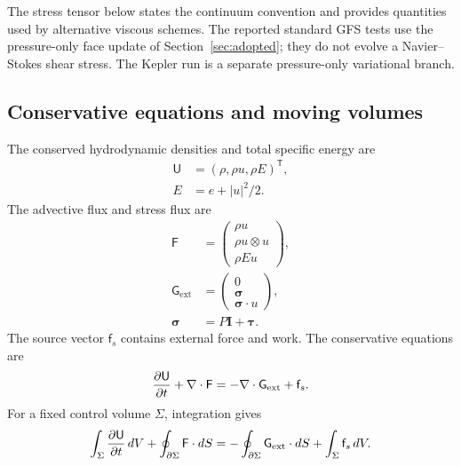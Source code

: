 \documentclass[twocolumn]{aastex63}
\newcommand{\vel}{{u}}
\newcommand{\surf}[0]{S}
\begin{document}
The stress tensor below states the continuum convention and provides
quantities used by alternative viscous schemes. The reported standard GFS
tests use the pressure-only face update of Section~\ref{sec:adopted}; they do
not evolve a Navier--Stokes shear stress. The Kepler run is a separate
pressure-only variational branch.

\subsection{Conservative equations and moving volumes}
The conserved hydrodynamic densities and total specific energy are
\begin{equation*}
\begin{aligned}
  \mathsf{U}&=(\rho,\rho\vel,\rho E)^\mathsf{T},\\
  E&=e+|\vel|^2/2.
\end{aligned}
\end{equation*}
The advective flux and stress flux are
\begin{equation}
\begin{aligned}
\mathsf{F}&=\begin{pmatrix}
  \rho\vel \\
  \rho\vel\otimes\vel \\
  \rho E\vel
\end{pmatrix},\\
\mathsf{G}_\textrm{ext}&=\begin{pmatrix}
  0 \\
  \boldsymbol{\sigma} \\
  \boldsymbol{\sigma}\cdot\vel
\end{pmatrix},\\
\boldsymbol{\sigma}&=P\boldsymbol{I}+\boldsymbol{\tau}.
\end{aligned}
\end{equation}
The source vector $\mathsf{f}_s$ contains external force and work. The
conservative equations are
\begin{equation}\label{basic1}
  {\partial\mathsf{U}\over\partial t}
  +\nabla\cdot\mathsf{F}
  =-\nabla\cdot\mathsf{G}_\textrm{ext}+\mathsf{f}_s.
\end{equation}
For a fixed control volume $\Sigma$, integration gives
\begin{equation}\label{basic}
  \int_\Sigma {\partial\mathsf{U}\over\partial t}\,dV
  +\oint_{\partial\Sigma}\mathsf{F}\cdot d\surf
  =-\oint_{\partial\Sigma}\mathsf{G}_\textrm{ext}\cdot d\surf
  +\int_\Sigma\mathsf{f}_s\,dV.
\end{equation}
\end{document}
